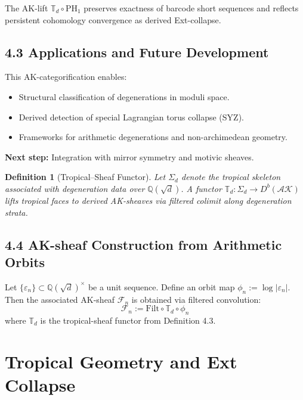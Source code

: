 \documentclass[11pt]{article}
\newtheorem{definition}[theorem]{Definition}
\begin{document}
\begin{lemma}
The AK-lift $\mathbb{T}_d \circ \mathrm{PH}_1$ preserves exactness of barcode short sequences and reflects persistent cohomology convergence as derived Ext-collapse.
\end{lemma}

\subsection{4.3 Applications and Future Development}

This AK-categorification enables:
\begin{itemize}
    \item Structural classification of degenerations in moduli space.
    \item Derived detection of special Lagrangian torus collapse (SYZ).
    \item Frameworks for arithmetic degenerations and non-archimedean geometry.
\end{itemize}

\textbf{Next step:} Integration with mirror symmetry and motivic sheaves.

\begin{definition}[Tropical--Sheaf Functor]
Let $\Sigma_d$ denote the tropical skeleton associated with degeneration data over $\mathbb{Q}(\sqrt{d})$.
A functor $\mathbb{T}_d : \Sigma_d \to D^b(\mathcal{AK})$ lifts tropical faces to derived AK-sheaves via filtered colimit along degeneration strata.
\end{definition}

\subsection{4.4 AK-sheaf Construction from Arithmetic Orbits}

\begin{lemma}
Let $\{\varepsilon_n\} \subset \mathbb{Q}(\sqrt{d})^\times$ be a unit sequence.
Define an orbit map $\phi_n := \log|\varepsilon_n|$.
Then the associated AK-sheaf $\mathcal{F}_n$ is obtained via filtered convolution:
\[
\mathcal{F}_n := \mathrm{Filt} \circ \mathbb{T}_d \circ \phi_n
\]
where $\mathbb{T}_d$ is the tropical-sheaf functor from Definition 4.3.
\end{lemma}


\section{Tropical Geometry and Ext Collapse}
\end{document}
